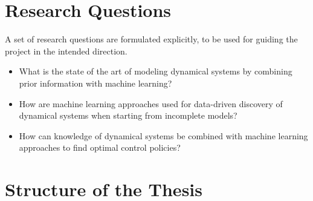 




\section{Research Questions}


A set of research questions are formulated explicitly, to be used for guiding the project in the intended direction.

\begin{itemize}
    \item What is the state of the art of modeling dynamical systems by combining prior information with machine learning?
    \item How are machine learning approaches used for data-driven discovery of dynamical systems when starting from incomplete models?
    \item How can knowledge of dynamical systems be combined with machine learning approaches to find optimal control policies?
\end{itemize}

\section{Structure of the Thesis}\label{sec:structure}

